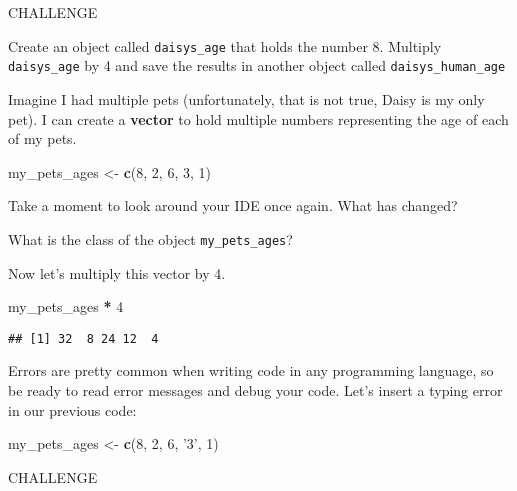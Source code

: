 \documentclass[]{book}
\newenvironment{Shaded}{\begin{snugshade}}{\end{snugshade}}
\newcommand{\DecValTok}[1]{\textcolor[rgb]{0.00,0.00,0.81}{#1}}
\newcommand{\KeywordTok}[1]{\textcolor[rgb]{0.13,0.29,0.53}{\textbf{#1}}}
\newcommand{\NormalTok}[1]{#1}
\newcommand{\OperatorTok}[1]{\textcolor[rgb]{0.81,0.36,0.00}{\textbf{#1}}}
\newcommand{\StringTok}[1]{\textcolor[rgb]{0.31,0.60,0.02}{#1}}
\begin{document}
\leavevmode\hypertarget{challenge}{}%
CHALLENGE

Create an object called \texttt{daisys\_age} that holds the number 8.
Multiply \texttt{daisys\_age} by 4 and save the results in another object called \texttt{daisys\_human\_age}

Imagine I had multiple pets (unfortunately, that is not true, Daisy is my only pet). I can create a \textbf{vector} to hold multiple numbers representing the age of each of my pets.

\begin{Shaded}
\begin{Highlighting}[]
\NormalTok{my_pets_ages <-}\StringTok{ }\KeywordTok{c}\NormalTok{(}\DecValTok{8}\NormalTok{, }\DecValTok{2}\NormalTok{, }\DecValTok{6}\NormalTok{, }\DecValTok{3}\NormalTok{, }\DecValTok{1}\NormalTok{)}
\end{Highlighting}
\end{Shaded}

\leavevmode\hypertarget{question}{}%
Take a moment to look around your IDE once again. What has changed?

What is the class of the object \texttt{my\_pets\_ages}?

Now let's multiply this vector by 4.

\begin{Shaded}
\begin{Highlighting}[]
\NormalTok{my_pets_ages }\OperatorTok{*}\StringTok{ }\DecValTok{4}
\end{Highlighting}
\end{Shaded}

\begin{verbatim}
## [1] 32  8 24 12  4
\end{verbatim}

Errors are pretty common when writing code in any programming language, so be ready to read error messages and debug your code. Let's insert a typing error in our previous code:

\begin{Shaded}
\begin{Highlighting}[]
\NormalTok{my_pets_ages <-}\StringTok{ }\KeywordTok{c}\NormalTok{(}\DecValTok{8}\NormalTok{, }\DecValTok{2}\NormalTok{, }\DecValTok{6}\NormalTok{, }\StringTok{'3'}\NormalTok{, }\DecValTok{1}\NormalTok{)}
\end{Highlighting}
\end{Shaded}

\leavevmode\hypertarget{challenge}{}%
CHALLENGE
\end{document}
